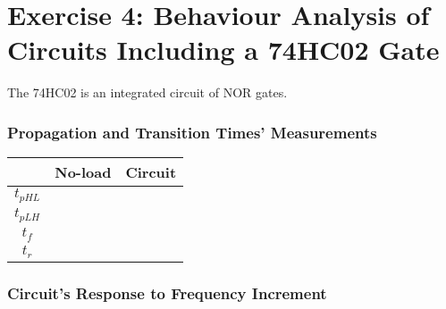 \documentclass[a4paper,11pt]{report}
\begin{document}
\section{\color{olive}Exercise 4: Behaviour Analysis of Circuits Including a 74HC02 Gate}

The 74HC02 is an integrated circuit of NOR gates.

\subsubsection{\color{red}Propagation and Transition Times' Measurements}

\begin{tabular}{|c|c|c|}
\hline
 &No-load & Circuit \\ %
\hline
\hline
$t_{pHL}$ & &  \\
\hline
$t_{pLH}$ &  & \\
\hline
$t_{f}$ &  & \\
\hline
$t_{r}$ & & \\
\hline
\end{tabular}


\subsubsection{\color{red}Circuit's Response to Frequency Increment}
\end{document}

